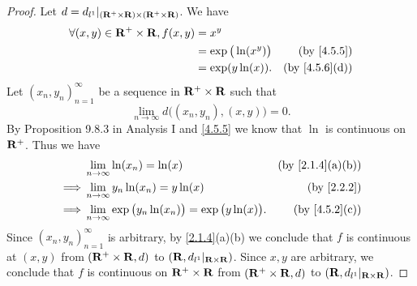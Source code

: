 \begin{proof}
  Let \(d = d_{l^1}|_{(\mathbf{R}^+ \times \mathbf{R}) \times (\mathbf{R}^+ \times \mathbf{R})}\).
  We have
  \begin{align*}
    \forall (x, y) \in \R^+ \times \R, f(x, y) & = x^y                                                  \\
                                               & = \exp\big(\ln(x^y)\big) & \text{(by \cref{4.5.5})}    \\
                                               & = \exp(y \ln(x)).        & \text{(by \cref{4.5.6}(d))}
  \end{align*}
  Let \((x_n, y_n)_{n = 1}^\infty\) be a sequence in \(\mathbf{R}^+ \times \mathbf{R}\) such that
  \[
    \lim_{n \to \infty} d\big((x_n, y_n), (x, y)\big) = 0.
  \]
  By Proposition 9.8.3 in Analysis I and \cref{4.5.5} we know that \(\ln\) is continuous on \(\mathbf{R}^+\).
  Thus we have
  \begin{align*}
             & \lim_{n \to \infty} \ln(x_n) = \ln(x)                                    & \text{(by \cref{2.1.4}(a)(b))} \\
    \implies & \lim_{n \to \infty} y_n \ln(x_n) = y \ln(x)                              & \text{(by \cref{2.2.2})}       \\
    \implies & \lim_{n \to \infty} \exp\big(y_n \ln(x_n)\big) = \exp\big(y \ln(x)\big). & \text{(by \cref{4.5.2}(c))}
  \end{align*}
  Since \((x_n, y_n)_{n = 1}^\infty\) is arbitrary, by \cref{2.1.4}(a)(b) we conclude that \(f\) is continuous at \((x, y)\) from \((\mathbf{R}^+ \times \mathbf{R}, d)\) to \((\mathbf{R}, d_{l^1}|_{\mathbf{R} \times \mathbf{R}})\).
  Since \(x, y\) are arbitrary, we conclude that \(f\) is continuous on \(\mathbf{R}^+ \times \mathbf{R}\) from \((\mathbf{R}^+ \times \mathbf{R}, d)\) to \((\mathbf{R}, d_{l^1}|_{\mathbf{R} \times \mathbf{R}})\).
\end{proof}